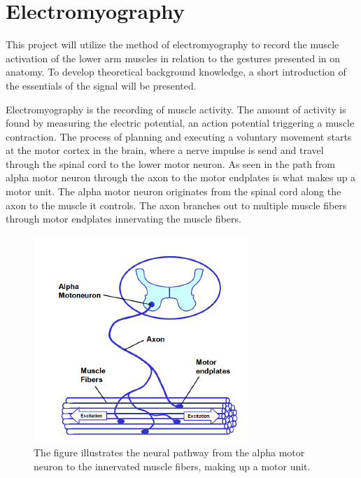 \section{Electromyography} \label{sec:BG:EMG}

This project will utilize the method of electromyography to record the muscle activation of the lower arm muscles in relation to the gestures presented in  on anatomy. To develop theoretical background knowledge, a short introduction of the essentials of the signal will be presented. 

Electromyography is the recording of muscle activity. The amount of activity is found by measuring the electric potential, an action potential triggering a muscle contraction. The process of planning and executing a voluntary movement starts at the motor cortex in the brain, where a nerve impulse is send and travel through the spinal cord to the lower motor neuron. As seen in  the path from alpha motor neuron through the axon to the motor endplates is what makes up a motor unit. The alpha motor neuron originates from the spinal cord along the axon to the muscle it controls. The axon branches out to multiple muscle fibers through motor endplates innervating the muscle fibers.

\begin{figure}[H]                                         
	\includegraphics[width=.4\textwidth]{figures/motor_unit}  
	\caption{The figure illustrates the neural pathway from the alpha motor neuron to the innervated muscle fibers, making up a motor unit.\cite{Konrad2005}}
	\label{fig:motor} 
\end{figure}  

